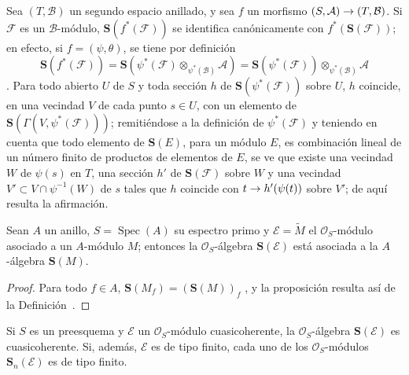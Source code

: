 \documentclass[oneside,10pt]{amsart}
\makeatletter
\newcommand{\ega@arrow}[2]{\mathchoice{#1}{#2}{#2}{#2}}
\renewcommand{\to}{\ega@arrow{\longrightarrow}{\rightarrow}}
\let\EGAOriginalLabel\label
\renewcommand{\label}[1]{\phantomsection\EGAOriginalLabel{#1}}
\makeatother
\begin{document}
\begin{env}[1.7.5]
\label{II.1.7.5-fr}
Sea $(T,\mathcal{B})$ un segundo espacio anillado, y sea $f$ un morfismo $(S,\mathcal{A})\to(T,\mathcal{B})$.
Si $\mathcal{F}$ es un $\mathcal{B}$-módulo, $\mathbf{S}(f^*(\mathcal{F}))$ se identifica canónicamente con $f^*(\mathbf{S}(\mathcal{F}))$; en efecto, si $f=(\psi,\theta)$, se tiene por definición 
\[
  \mathbf{S}(f^*(\mathcal{F}))
  =\mathbf{S}(\psi^*(\mathcal{F})
    \otimes_{\psi^*(\mathcal{B})}\mathcal{A})
  =\mathbf{S}(\psi^*(\mathcal{F}))
    \otimes_{\psi^*(\mathcal{B})}\mathcal{A}
\]
.
Para todo abierto $U$ de $S$ y toda sección $h$ de $\mathbf{S}(\psi^*(\mathcal{F}))$ sobre $U$, $h$ coincide, en una vecindad $V$ de cada punto $s\in U$, con un elemento de $\mathbf{S}(\Gamma(V,\psi^*(\mathcal{F})))$; remitiéndose a la definición de $\psi^*(\mathcal{F})$  y teniendo en cuenta que todo elemento de $\mathbf{S}(E)$, para un módulo $E$, es combinación lineal de un número finito de productos de elementos de $E$, se ve que existe una vecindad $W$ de $\psi(s)$ en $T$, una sección $h'$ de $\mathbf{S}(\mathcal{F})$ sobre $W$ y una vecindad $V'\subset V\cap\psi^{-1}(W)$ de $s$ tales que $h$ coincide con $t\to h'(\psi(t))$ sobre $V'$; de aquí resulta la afirmación.
\end{env}

\begin{proposition}[1.7.6]
\label{II.1.7.6-fr}
Sean $A$ un anillo, $S=\operatorname{Spec}(A)$ su espectro primo y $\mathcal{E}=\widetilde{M}$ el $\mathcal{O}_S$-módulo asociado a un $A$-módulo $M$; entonces la $\mathcal{O}_S$-álgebra $\mathbf{S}(\mathcal{E})$ está asociada a la $A$-álgebra $\mathbf{S}(M)$.
\end{proposition}

\begin{proof}
Para todo $f\in A$, $\mathbf{S}(M_f)=(\mathbf{S}(M))_f$ , y la proposición resulta así de la Definición~.
\end{proof}

\begin{corollary}[1.7.7]
\label{II.1.7.7-fr}
Si $S$ es un preesquema y $\mathcal{E}$ un $\mathcal{O}_S$-módulo cuasicoherente, la $\mathcal{O}_S$-álgebra $\mathbf{S}(\mathcal{E})$ es cuasicoherente.
Si, además, $\mathcal{E}$ es de tipo finito, cada uno de los $\mathcal{O}_S$-módulos $\mathbf{S}_n(\mathcal{E})$ es de tipo finito.
\end{corollary}
\end{document}
